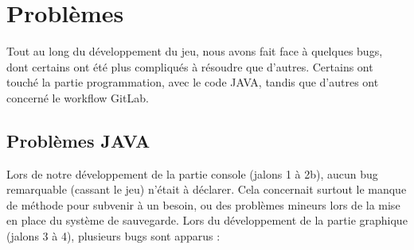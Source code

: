 \documentclass[a4paper, 12pt]{article}
\begin{document}
    \section{Problèmes}
        
        Tout au long du développement du jeu, nous avons fait face à quelques bugs, dont certains ont été plus compliqués à résoudre que d'autres.
        Certains ont touché la partie programmation, avec le code JAVA, tandis que d'autres ont concerné le workflow GitLab.

        \subsection{Problèmes JAVA}
            Lors de notre développement de la partie console (jalons 1 à 2b), aucun bug remarquable (cassant le jeu) n'était à déclarer.
            Cela concernait surtout le manque de méthode pour subvenir à un besoin, ou des problèmes mineurs lors de la mise en place du système de sauvegarde.
            Lors du développement de la partie graphique (jalons 3 à 4), plusieurs bugs sont apparus :
\end{document}

